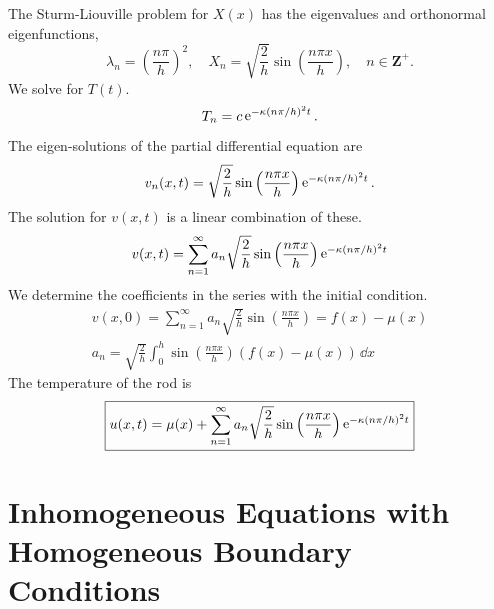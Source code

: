The Sturm-Liouville problem for $X(x)$ has the eigenvalues and 
orthonormal eigenfunctions,
\[
\lambda_n = \left( \frac{n \pi}{h} \right)^2, \quad
X_n = \sqrt{ \frac{2}{h} } \sin \left( \frac{n \pi x}{h} \right), \quad
n \in \mathbf{Z}^+.
\]
We solve for $T(t)$.
\[
T_n = c \mathop{\mathrm{e}}\nolimits^{- \kappa (n \pi / h)^2 t}.
\]
The eigen-solutions of the partial differential equation are
\[
v_n(x,t) = \sqrt{ \frac{2}{h} } \sin \left( \frac{n \pi x}{h} \right) 
\mathop{\mathrm{e}}\nolimits^{- \kappa (n \pi/h)^2 t}.
\]
The solution for $v(x,t)$ is a linear combination of these.
\[
v(x,t) = \sum_{n=1}^\infty a_n \sqrt{ \frac{2}{h} } 
\sin \left( \frac{n \pi x}{h} \right) 
\mathop{\mathrm{e}}\nolimits^{- \kappa (n \pi/h)^2 t}
\]
We determine the coefficients in the series with the initial condition.
\begin{gather*}
  v(x,0) = \sum_{n=1}^\infty a_n \sqrt{ \frac{2}{h} }
  \sin \left( \frac{n \pi x}{h} \right) 
  = f(x) - \mu(x) \\
  \boxed{
    a_n = \sqrt{ \frac{2}{h} } \int_0^h  
    \sin \left( \frac{n \pi x}{h} \right) (f(x) - \mu(x)) \,\dd x
    }
\end{gather*}
The temperature of the rod is 
\[
\boxed{
  u(x,t) = \mu(x) + \sum_{n=1}^\infty a_n \sqrt{ \frac{2}{h} }
  \sin \left( \frac{n \pi x}{h} \right) 
  \mathop{\mathrm{e}}\nolimits^{- \kappa (n \pi/h)^2 t}
  }
\]



\section{Inhomogeneous Equations with Homogeneous Boundary Conditions}



